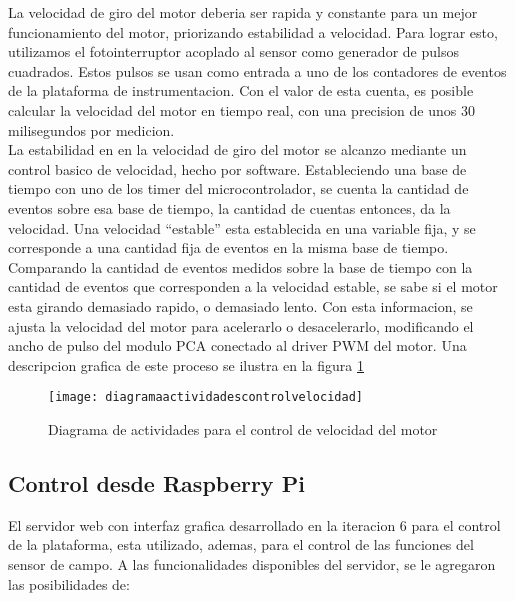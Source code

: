La velocidad de giro del motor deberia ser rapida y constante para un mejor funcionamiento del motor, priorizando estabilidad a velocidad. Para lograr esto, utilizamos el fotointerruptor acoplado al sensor como generador de pulsos cuadrados. Estos pulsos se usan como entrada a uno de los contadores de eventos de la plataforma de instrumentacion. Con el valor de esta cuenta, es posible calcular la velocidad del motor en tiempo real, con una precision de unos 30 milisegundos por medicion. \\

La estabilidad en en la velocidad de giro del motor se alcanzo mediante un control basico de velocidad, hecho por software. Estableciendo una base de tiempo con uno de los timer del microcontrolador, se cuenta la cantidad de eventos sobre esa base de tiempo, la cantidad de cuentas entonces, da la velocidad. Una velocidad ``estable'' esta establecida en una variable fija, y se corresponde a una cantidad fija de eventos en la misma base de tiempo. Comparando la cantidad de eventos medidos sobre la base de tiempo con la cantidad de eventos que corresponden a la velocidad estable, se sabe si el motor esta girando demasiado rapido, o demasiado lento. Con esta informacion, se ajusta la velocidad del motor para acelerarlo o desacelerarlo, modificando el ancho de pulso del modulo PCA conectado al driver PWM del motor. Una descripcion grafica de este proceso se ilustra en la figura \ref{fig:diagramaactividadescontrolvelocidad}

\begin{figure}[h]
  \centering
  \texttt{[image: diagramaactividadescontrolvelocidad]}
  \caption{Diagrama de actividades para el control de velocidad del motor}\label{fig:diagramaactividadescontrolvelocidad}
\end{figure}


\subsection{Control desde Raspberry Pi} %
\label{sub:control_desde_raspberry_pi}

El servidor web con interfaz grafica desarrollado en la iteracion 6 para el control de la plataforma, esta utilizado, ademas, para el control de las funciones del sensor de campo. A las funcionalidades disponibles del servidor, se le agregaron las posibilidades de:

